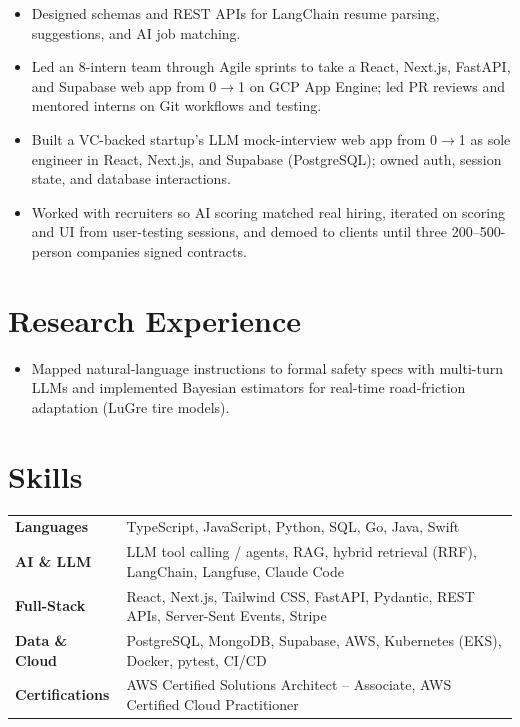\documentclass[11pt, letterpaper]{article}
\begin{document}
\begin{itemize}
  \item Designed schemas and REST APIs for LangChain resume parsing, suggestions, and AI job matching.
  \item Led an 8-intern team through Agile sprints to take a React, Next.js, FastAPI, and Supabase web app from 0$\to$1 on GCP App Engine; led PR reviews and mentored interns on Git workflows and testing.
\end{itemize}

\begin{itemize}
  \item Built a VC-backed startup's LLM mock-interview web app from 0$\to$1 as sole engineer in React, Next.js, and Supabase (PostgreSQL); owned auth, session state, and database interactions.
  \item Worked with recruiters so AI scoring matched real hiring, iterated on scoring and UI from user-testing sessions, and demoed to clients until three 200--500-person companies signed contracts.
\end{itemize}

\section{Research Experience}
\begin{itemize}
  \item Mapped natural-language instructions to formal safety specs with multi-turn LLMs and implemented Bayesian estimators for real-time road-friction adaptation (LuGre tire models).
\end{itemize}

\section{Skills}
\begin{tabularx}{\textwidth}{@{}l @{\hspace{7pt}} >{\raggedright\arraybackslash}X@{}}
  \textbf{Languages} & TypeScript, JavaScript, Python, SQL, Go, Java, Swift \\[1pt]
  \textbf{AI \& LLM} & LLM tool calling / agents, RAG, hybrid retrieval (RRF), LangChain, Langfuse, Claude Code \\[1pt]
  \textbf{Full-Stack} & React, Next.js, Tailwind CSS, FastAPI, Pydantic, REST APIs, Server-Sent Events, Stripe \\[1pt]
  \textbf{Data \& Cloud} & PostgreSQL, MongoDB, Supabase, AWS, Kubernetes (EKS), Docker, pytest, CI/CD \\[1pt]
  \textbf{Certifications} & AWS Certified Solutions Architect -- Associate, AWS Certified Cloud Practitioner \\
\end{tabularx}
\end{document}
